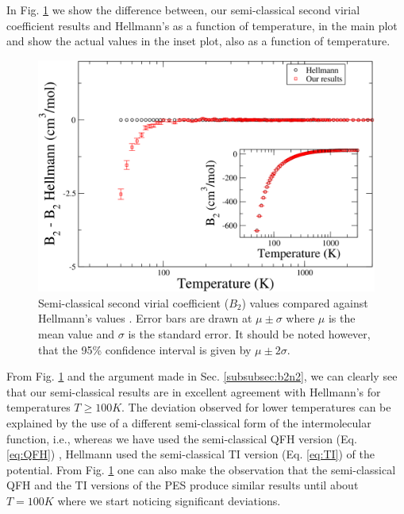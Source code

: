         In Fig. \ref{fig:B2SCN2} we show the difference between, our semi-classical second virial coefficient results and Hellmann's as a function of temperature, in the main plot and show the actual values in the inset plot, also as a function of temperature.
        \begin{figure}[!htbp]
            \centering
            \includegraphics[scale=0.20,keepaspectratio]{Chapter-5/Figures/B2SC9sResultsAll.png}
            \caption{Semi-classical second virial coefficient ($B_2$) values compared against Hellmann's values \cite{Hellmann2013}. Error bars are drawn at $\mu \pm \sigma$ where $\mu$ is the mean value and $\sigma$ is the standard error. It should be noted however, that the 95\% confidence interval is given by $\mu \pm 2\sigma$.}
            \label{fig:B2SCN2}
        \end{figure}
        From Fig. \ref{fig:B2SCN2} and the argument made in Sec. \ref{subsubsec:b2n2}, we can clearly see that our semi-classical results are in excellent agreement with Hellmann's for temperatures $T \ge 100K$. The deviation observed for lower temperatures can be explained by the use of a different semi-classical form of the intermolecular function, i.e., whereas we have used the semi-classical QFH version (Eq. \eqref{eq:QFH}) , Hellmann used the semi-classical TI version (Eq. \eqref{eq:TI}) of the \abinitio{} potential. From Fig. \ref{fig:B2SCN2} one can also make the observation that the semi-classical QFH and the TI versions of the \abinitio{} PES produce similar results until about $T = 100K$ where we start noticing significant deviations.

